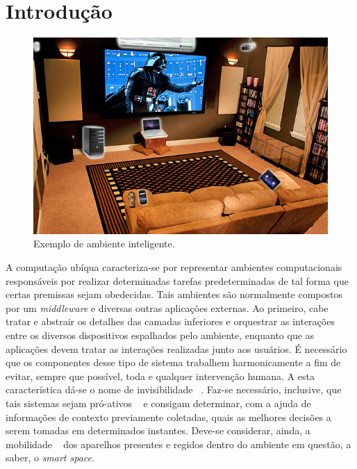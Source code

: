 \chapter{Introdução}

\begin{figure}[ht]
	\center
	\includegraphics[scale=0.7]{imagens/salaUbiqua}
	\caption{Exemplo de ambiente inteligente.}
	\label{fig:ambienteInteligente}
\end{figure}

A computação ubíqua caracteriza-se por representar ambientes computacionais responsáveis por realizar determinadas tarefas predeterminadas de tal forma que certas premissas sejam obedecidas. Tais ambientes são normalmente compostos por um \emph{middleware} e diversas outras aplicações externas. Ao primeiro, cabe tratar e abstrair os detalhes das camadas inferiores e orquestrar as interações entre os diversos dispositivos espalhados pelo ambiente, enquanto que as aplicações devem tratar as interações realizadas junto aos usuários. É necessário que os componentes desse tipo de sistema trabalhem harmonicamente a fim de evitar, sempre que possível, toda e qualquer intervenção humana. A esta característica dá-se o nome de invisibilidade ~\cite{gomes2007, weiser1993, weiser1999}. Faz-se necessário, inclusive, que tais sistemas sejam pró-ativos ~\cite{gomes2007, buzeto2010} e consigam determinar, com a ajuda de informações de contexto previamente coletadas, quais as melhores decisões a serem tomadas em determinados instantes. Deve-se considerar, ainda, a mobilidade ~\cite{gomes2007, buzeto2010, weiser1999} dos aparelhos presentes e regidos dentro do ambiente em questão, a saber, o \emph{smart space}.

